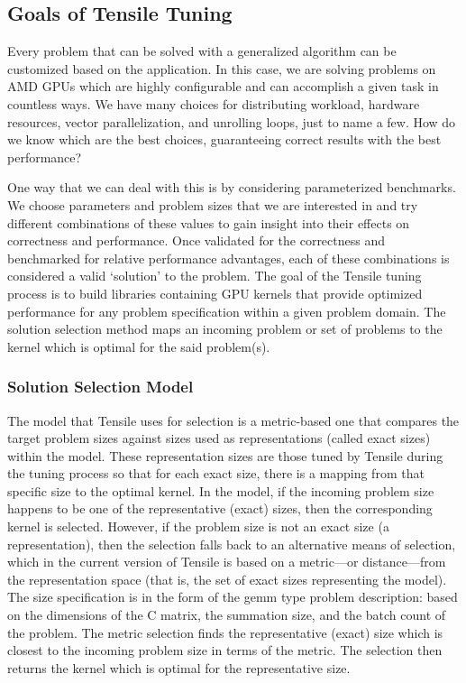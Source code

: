\documentclass[]{article}
\begin{document}
\subsection{Goals of Tensile Tuning}

Every problem that can be solved with a generalized algorithm can be customized based on the application. In this case, we are solving problems on AMD GPUs which are highly configurable and can accomplish a given task in countless ways. We have many choices for distributing workload, hardware resources, vector parallelization, and unrolling loops, just to name a few. How do we know which are the best choices, guaranteeing correct results with the best performance?

One way that we can deal with this is by considering parameterized benchmarks. We choose parameters and problem sizes that we are interested in and try different combinations of these values to gain insight into their effects on correctness and performance. Once validated for the correctness and benchmarked for relative performance advantages, each of these combinations is considered a valid `solution' to the problem. The goal of the Tensile tuning process is to build libraries containing GPU kernels that provide optimized performance for any problem specification within a given problem domain. The solution selection method maps an incoming problem or set of problems to the kernel which is optimal for the said problem(s).

\subsubsection{Solution Selection Model}

The model that Tensile uses for selection is a metric-based one that compares the target problem sizes against sizes used as representations (called exact sizes) within the model. These representation sizes are those tuned by Tensile during the tuning process so that for each exact size, there is a mapping from that specific size to the optimal kernel. In the model, if the incoming problem size happens to be one of the representative (exact) sizes, then the corresponding kernel is selected. However, if the problem size is not an exact size (a representation), then the selection falls back to an alternative means of selection, which in the current version of Tensile is based on a metric---or distance---from the representation space (that is, the set of exact sizes representing the model). The size specification is in the form of the gemm type problem description: based on the dimensions of the C matrix, the summation size, and the batch count of the problem. The metric selection finds the representative (exact) size which is closest to the incoming problem size in terms of the metric. The selection then returns the kernel which is optimal for the representative size.
\end{document}
